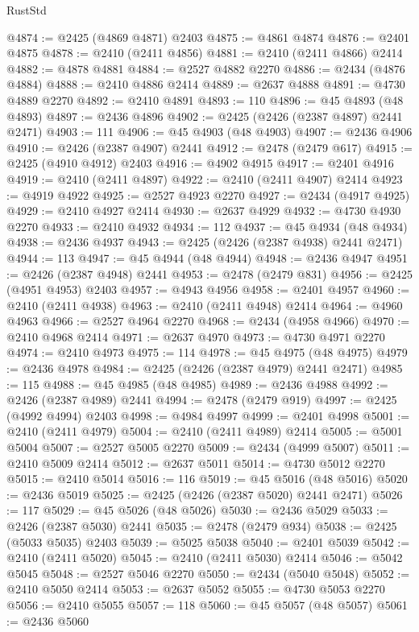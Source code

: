 \begin{lexlean}{RustStd}
\begin{coremodule}
@4874 := @2425 (@4869 @4871) @2403
@4875 := @4861 @4874
@4876 := @2401 @4875
@4878 := @2410 (@2411 @4856)
@4881 := @2410 (@2411 @4866) @2414
@4882 := @4878 @4881
@4884 := @2527 @4882 @2270
@4886 := @2434 (@4876 @4884)
@4888 := @2410 @4886 @2414
@4889 := @2637 @4888
@4891 := @4730 @4889 @2270
@4892 := @2410 @4891
@4893 := 110
@4896 := @45 @4893 (@48 @4893)
@4897 := @2436 @4896
@4902 := @2425 (@2426 (@2387 @4897) @2441 @2471)
@4903 := 111
@4906 := @45 @4903 (@48 @4903)
@4907 := @2436 @4906
@4910 := @2426 (@2387 @4907) @2441
@4912 := @2478 (@2479 @617)
@4915 := @2425 (@4910 @4912) @2403
@4916 := @4902 @4915
@4917 := @2401 @4916
@4919 := @2410 (@2411 @4897)
@4922 := @2410 (@2411 @4907) @2414
@4923 := @4919 @4922
@4925 := @2527 @4923 @2270
@4927 := @2434 (@4917 @4925)
@4929 := @2410 @4927 @2414
@4930 := @2637 @4929
@4932 := @4730 @4930 @2270
@4933 := @2410 @4932
@4934 := 112
@4937 := @45 @4934 (@48 @4934)
@4938 := @2436 @4937
@4943 := @2425 (@2426 (@2387 @4938) @2441 @2471)
@4944 := 113
@4947 := @45 @4944 (@48 @4944)
@4948 := @2436 @4947
@4951 := @2426 (@2387 @4948) @2441
@4953 := @2478 (@2479 @831)
@4956 := @2425 (@4951 @4953) @2403
@4957 := @4943 @4956
@4958 := @2401 @4957
@4960 := @2410 (@2411 @4938)
@4963 := @2410 (@2411 @4948) @2414
@4964 := @4960 @4963
@4966 := @2527 @4964 @2270
@4968 := @2434 (@4958 @4966)
@4970 := @2410 @4968 @2414
@4971 := @2637 @4970
@4973 := @4730 @4971 @2270
@4974 := @2410 @4973
@4975 := 114
@4978 := @45 @4975 (@48 @4975)
@4979 := @2436 @4978
@4984 := @2425 (@2426 (@2387 @4979) @2441 @2471)
@4985 := 115
@4988 := @45 @4985 (@48 @4985)
@4989 := @2436 @4988
@4992 := @2426 (@2387 @4989) @2441
@4994 := @2478 (@2479 @919)
@4997 := @2425 (@4992 @4994) @2403
@4998 := @4984 @4997
@4999 := @2401 @4998
@5001 := @2410 (@2411 @4979)
@5004 := @2410 (@2411 @4989) @2414
@5005 := @5001 @5004
@5007 := @2527 @5005 @2270
@5009 := @2434 (@4999 @5007)
@5011 := @2410 @5009 @2414
@5012 := @2637 @5011
@5014 := @4730 @5012 @2270
@5015 := @2410 @5014
@5016 := 116
@5019 := @45 @5016 (@48 @5016)
@5020 := @2436 @5019
@5025 := @2425 (@2426 (@2387 @5020) @2441 @2471)
@5026 := 117
@5029 := @45 @5026 (@48 @5026)
@5030 := @2436 @5029
@5033 := @2426 (@2387 @5030) @2441
@5035 := @2478 (@2479 @934)
@5038 := @2425 (@5033 @5035) @2403
@5039 := @5025 @5038
@5040 := @2401 @5039
@5042 := @2410 (@2411 @5020)
@5045 := @2410 (@2411 @5030) @2414
@5046 := @5042 @5045
@5048 := @2527 @5046 @2270
@5050 := @2434 (@5040 @5048)
@5052 := @2410 @5050 @2414
@5053 := @2637 @5052
@5055 := @4730 @5053 @2270
@5056 := @2410 @5055
@5057 := 118
@5060 := @45 @5057 (@48 @5057)
@5061 := @2436 @5060

\end{coremodule}
\end{lexlean}
